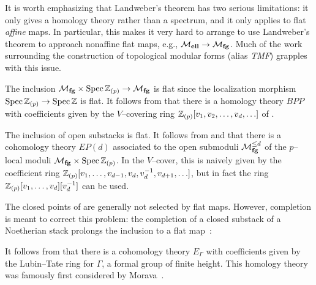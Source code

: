 \begin{remark}
It is worth emphasizing that Landweber's theorem has two serious limitations: it only gives a homology theory rather than a spectrum, and it only applies to flat \emph{affine} maps.  In particular, this makes it very hard to arrange to use Landweber's theorem to approach nonaffine flat maps, e.g., $\mathcal{M}_{\mathbf{ell}} \to \mathcal{M}_{\mathbf{fg}}$.  Much of the work surrounding the construction of topological modular forms (alias \textit{TMF}) grapples with this issue.
\end{remark}

\begin{example}
The inclusion $\mathcal{M}_{\mathbf{fg}} \times \operatorname{Spec} \mathbb Z_{(p)} \to \mathcal{M}_{\mathbf{fg}}$ is flat since the localization morphism $\operatorname{Spec} \mathbb Z_{(p)} \to \operatorname{Spec} \mathbb Z$ is flat.  It follows from  that there is a homology theory $BPP$ with coefficients given by the $V$--covering ring $\mathbb Z_{(p)}[v_1, v_2, \ldots, v_d, \ldots]$ of .
\end{example}

\begin{example}\label{JohnsonWilsonTheories}
The inclusion of open substacks is flat.  It follows from  and  that there is a cohomology theory $EP(d)$ associated to the open submoduli $\mathcal{M}_{\mathbf{fg}}^{\le d}$ of the $p$--local moduli $\mathcal{M}_{\mathbf{fg}} \times \operatorname{Spec} \mathbb Z_{(p)}$.  In the $V$--cover, this is naively given by the coefficient ring $\mathbb Z_{(p)}[v_1, \ldots, v_{d-1}, v_d, v_d^{-1}, v_{d+1}, \ldots]$, but in fact the ring $\mathbb Z_{(p)}[v_1, \ldots, v_d][v_d^{-1}]$ can be used.
\end{example}

\begin{example}\label{DefnEThy}
The closed points of  are generally not selected by flat maps.  However, completion is meant to correct this problem: the completion of a closed substack of a Noetherian stack prolongs the inclusion to a flat map~\cite{Matsumura}:
\begin{center}
\end{center}
It follows from  that there is a cohomology theory $E_\Gamma$ with coefficients given by the Lubin--Tate ring for $\Gamma$, a formal group of finite height.  This homology theory was famously first considered by Morava~\cite{Morava}.
\end{example}

